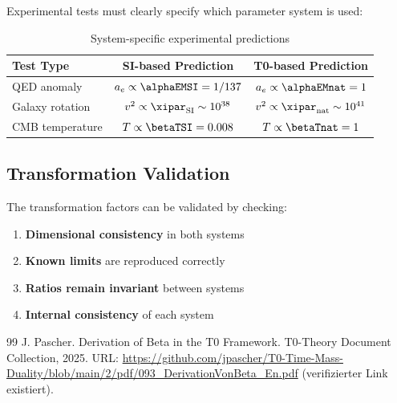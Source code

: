 	Experimental tests must clearly specify which parameter system is used:
	
	\begin{table}[htbp]
		\centering
		\begin{tabular}{lcc}
			\toprule
			\textbf{Test Type} & \textbf{SI-based Prediction} & \textbf{T0-based Prediction} \\
			\midrule
			QED anomaly & $a_e \propto \alphaEMSI = 1/137$ & $a_e \propto \alphaEMnat = 1$ \\
			Galaxy rotation & $v^2 \propto \xipar_{\text{SI}} \sim 10^{38}$ & $v^2 \propto \xipar_{\text{nat}} \sim 10^{41}$ \\
			CMB temperature & $T \propto \betaTSI = 0.008$ & $T \propto \betaTnat = 1$ \\
			\bottomrule
		\end{tabular}
		\caption{System-specific experimental predictions}
		\label{tab:system_predictions}
	\end{table}
	
	\subsection{Transformation Validation}
	\label{subsec:transformation_validation}
	
	The transformation factors can be validated by checking:
	
	\begin{enumerate}
		\item \textbf{Dimensional consistency} in both systems
		\item \textbf{Known limits} are reproduced correctly
		\item \textbf{Ratios remain invariant} between systems
		\item \textbf{Internal consistency} of each system
	\end{enumerate}

\begin{thebibliography}{99}
	J. Pascher.
	\newblock Derivation of Beta in the T0 Framework.
	\newblock T0-Theory Document Collection, 2025.
	\newblock URL: \url{https://github.com/jpascher/T0-Time-Mass-Duality/blob/main/2/pdf/093_DerivationVonBeta_En.pdf}
	(verifizierter Link existiert).
\end{thebibliography}